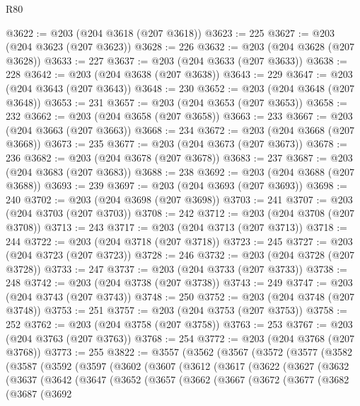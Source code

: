 \begin{lexlean}{R80}
\begin{coremodule}
@3622 := @203 (@204 @3618 (@207 @3618))
@3623 := 225
@3627 := @203 (@204 @3623 (@207 @3623))
@3628 := 226
@3632 := @203 (@204 @3628 (@207 @3628))
@3633 := 227
@3637 := @203 (@204 @3633 (@207 @3633))
@3638 := 228
@3642 := @203 (@204 @3638 (@207 @3638))
@3643 := 229
@3647 := @203 (@204 @3643 (@207 @3643))
@3648 := 230
@3652 := @203 (@204 @3648 (@207 @3648))
@3653 := 231
@3657 := @203 (@204 @3653 (@207 @3653))
@3658 := 232
@3662 := @203 (@204 @3658 (@207 @3658))
@3663 := 233
@3667 := @203 (@204 @3663 (@207 @3663))
@3668 := 234
@3672 := @203 (@204 @3668 (@207 @3668))
@3673 := 235
@3677 := @203 (@204 @3673 (@207 @3673))
@3678 := 236
@3682 := @203 (@204 @3678 (@207 @3678))
@3683 := 237
@3687 := @203 (@204 @3683 (@207 @3683))
@3688 := 238
@3692 := @203 (@204 @3688 (@207 @3688))
@3693 := 239
@3697 := @203 (@204 @3693 (@207 @3693))
@3698 := 240
@3702 := @203 (@204 @3698 (@207 @3698))
@3703 := 241
@3707 := @203 (@204 @3703 (@207 @3703))
@3708 := 242
@3712 := @203 (@204 @3708 (@207 @3708))
@3713 := 243
@3717 := @203 (@204 @3713 (@207 @3713))
@3718 := 244
@3722 := @203 (@204 @3718 (@207 @3718))
@3723 := 245
@3727 := @203 (@204 @3723 (@207 @3723))
@3728 := 246
@3732 := @203 (@204 @3728 (@207 @3728))
@3733 := 247
@3737 := @203 (@204 @3733 (@207 @3733))
@3738 := 248
@3742 := @203 (@204 @3738 (@207 @3738))
@3743 := 249
@3747 := @203 (@204 @3743 (@207 @3743))
@3748 := 250
@3752 := @203 (@204 @3748 (@207 @3748))
@3753 := 251
@3757 := @203 (@204 @3753 (@207 @3753))
@3758 := 252
@3762 := @203 (@204 @3758 (@207 @3758))
@3763 := 253
@3767 := @203 (@204 @3763 (@207 @3763))
@3768 := 254
@3772 := @203 (@204 @3768 (@207 @3768))
@3773 := 255
@3822 := @3557
    (@3562
      (@3567
        (@3572
          (@3577
            (@3582
              (@3587
                (@3592
                  (@3597
                    (@3602
                      (@3607
                        (@3612
                          (@3617
                            (@3622
                              (@3627
                                (@3632
                                  (@3637
                                    (@3642
                                      (@3647
                                        (@3652
                                          (@3657
                                            (@3662
                                              (@3667
                                                (@3672
                                                  (@3677
                                                    (@3682
                                                      (@3687
                                                        (@3692

\end{coremodule}
\end{lexlean}
